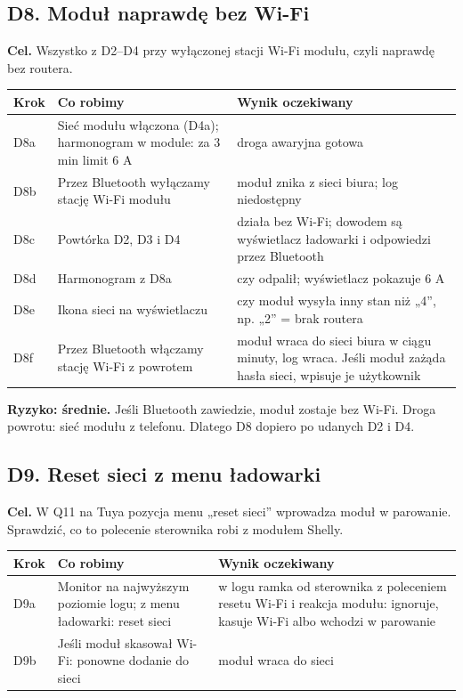 \documentclass[11pt,a4paper]{article}
\begin{document}
\subsection{D8. Moduł naprawdę bez Wi-Fi}

\textbf{Cel.} Wszystko z D2–D4 przy wyłączonej stacji Wi-Fi modułu, czyli naprawdę bez routera.


\begin{longtable}{>{\raggedright\arraybackslash}p{3.00cm}>{\raggedright\arraybackslash}p{4.84cm}>{\raggedright\arraybackslash}p{7.44cm}}
\toprule
\rowcolor{apteallight}\textbf{Krok} & \textbf{Co robimy} & \textbf{Wynik oczekiwany} \\
\midrule\endhead
\bottomrule\endfoot
D8a & Sieć modułu włączona (D4a); harmonogram w module: za 3 min limit 6 A & droga awaryjna gotowa \\
D8b & Przez Bluetooth wyłączamy stację Wi-Fi modułu & moduł znika z sieci biura; log niedostępny \\
D8c & Powtórka D2, D3 i D4 & działa bez Wi-Fi; dowodem są wyświetlacz ładowarki i odpowiedzi przez Bluetooth \\
D8d & Harmonogram z D8a & czy odpalił; wyświetlacz pokazuje 6 A \\
D8e & Ikona sieci na wyświetlaczu & czy moduł wysyła inny stan niż „4”, np. „2” = brak routera \\
D8f & Przez Bluetooth włączamy stację Wi-Fi z powrotem & moduł wraca do sieci biura w ciągu minuty, log wraca. Jeśli moduł zażąda hasła sieci, wpisuje je użytkownik \\
\end{longtable}

\textbf{Ryzyko: średnie.} Jeśli Bluetooth zawiedzie, moduł zostaje bez Wi-Fi. Droga powrotu: sieć modułu z telefonu. Dlatego D8 dopiero po udanych D2 i D4.


\subsection{D9. Reset sieci z menu ładowarki}

\textbf{Cel.} W Q11 na Tuya pozycja menu „reset sieci” wprowadza moduł w parowanie. Sprawdzić, co to polecenie sterownika robi z modułem Shelly.


\begin{longtable}{>{\raggedright\arraybackslash}p{3.00cm}>{\raggedright\arraybackslash}p{5.55cm}>{\raggedright\arraybackslash}p{6.73cm}}
\toprule
\rowcolor{apteallight}\textbf{Krok} & \textbf{Co robimy} & \textbf{Wynik oczekiwany} \\
\midrule\endhead
\bottomrule\endfoot
D9a & Monitor na najwyższym poziomie logu; z menu ładowarki: reset sieci & w logu ramka od sterownika z poleceniem resetu Wi-Fi i reakcja modułu: ignoruje, kasuje Wi-Fi albo wchodzi w parowanie \\
D9b & Jeśli moduł skasował Wi-Fi: ponowne dodanie do sieci & moduł wraca do sieci \\
\end{longtable}
\end{document}
